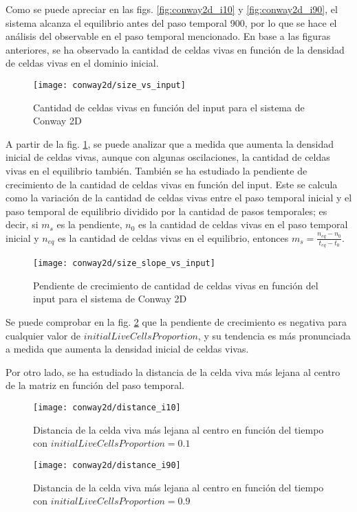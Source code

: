 Como se puede apreciar en las figs. \ref{fig:conway2d_i10} y \ref{fig:conway2d_i90}, el sistema alcanza el equilibrio
antes del paso temporal 900, por lo que se hace el análisis del observable en el paso temporal mencionado.
En base a las figuras anteriores, se ha observado la cantidad de celdas vivas en función de la densidad de celdas
vivas en el dominio inicial.

\begin{figure}[H]
    \centering
    \texttt{[image: conway2d/size\_vs\_input]}
    \caption{Cantidad de celdas vivas en función del input para el sistema de Conway 2D}
    \label{fig:conway2d_size_vs_input}
\end{figure}

A partir de la fig. \ref{fig:conway2d_size_vs_input}, se puede analizar que a medida que aumenta la densidad inicial de
celdas vivas, aunque con algunas oscilaciones, la cantidad de celdas vivas en el equilibrio también.
También se ha estudiado la pendiente de crecimiento de la cantidad de celdas vivas en función del input.
Este se calcula como la variación de la cantidad de celdas vivas entre el paso temporal inicial y el paso temporal
de equilibrio dividido por la cantidad de pasos temporales; es decir, si $m_{s}$ es la pendiente, $n_{0}$ es la
cantidad de celdas vivas en el paso temporal inicial y $n_{eq}$ es la cantidad de celdas vivas en el equilibrio,
entonces $m_{s} = \frac{n_{eq} - n_0}{t_{eq} - t_{0}}$.

\begin{figure}[H]
    \centering
    \texttt{[image: conway2d/size\_slope\_vs\_input]}
    \caption{Pendiente de crecimiento de cantidad de celdas vivas en función del input para el sistema de Conway 2D}
    \label{fig:conway2d_size_slope_vs_input}
\end{figure}

Se puede comprobar en la fig. \ref{fig:conway2d_size_slope_vs_input} que la pendiente de crecimiento es negativa
para cualquier valor de $initialLiveCellsProportion$, y su tendencia es más pronunciada a medida que aumenta la
densidad inicial de celdas vivas.

Por otro lado, se ha estudiado la distancia de la celda viva más lejana al centro de la matriz en función del
paso temporal.

\begin{figure}[H]
    \centering
    \texttt{[image: conway2d/distance\_i10]}
    \caption{Distancia de la celda viva más lejana al centro en función del tiempo con $initialLiveCellsProportion = 0.1$}
    \label{fig:conway2d_d10}
\end{figure}
\begin{figure}[H]
    \centering
    \texttt{[image: conway2d/distance\_i90]}
    \caption{Distancia de la celda viva más lejana al centro en función del tiempo con $initialLiveCellsProportion = 0.9$}
    \label{fig:conway2d_d90}
\end{figure}

